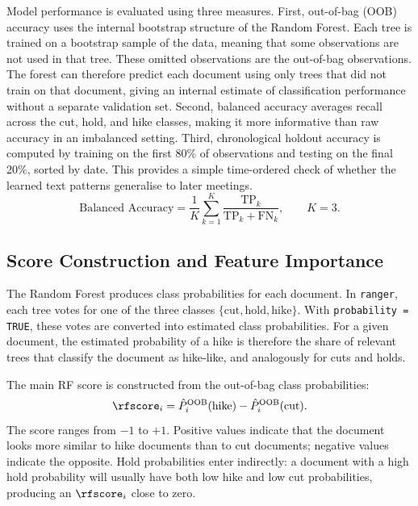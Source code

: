 Model performance is evaluated using three measures. First, out-of-bag
(OOB) accuracy uses the internal bootstrap structure of the Random
Forest. Each tree is trained on a bootstrap sample of the data, meaning
that some observations are not used in that tree. These omitted
observations are the out-of-bag observations. The forest can therefore
predict each document using only trees that did not train on that
document, giving an internal estimate of classification performance
without a separate validation set. Second, balanced accuracy averages
recall across the cut, hold, and hike classes, making it more informative
than raw accuracy in an imbalanced setting. Third, chronological holdout
accuracy is computed by training on the first 80\% of observations and
testing on the final 20\%, sorted by date. This provides a simple
time-ordered check of whether the learned text patterns generalise to
later meetings.
%
\begin{equation}
\label{eq:balanced_acc}
\text{Balanced Accuracy} = \frac{1}{K} \sum_{k=1}^{K}
  \frac{\text{TP}_k}{\text{TP}_k + \text{FN}_k},
  \qquad K=3.
\end{equation}


\subsection{Score Construction and Feature Importance}
\label{sec:meth_rf_score}
\label{sec:meth_rf_importance}
\label{sec:meth_model_selection}

The Random Forest produces class probabilities for each document. In
\texttt{ranger}, each tree votes for one of the three classes
\(\{\text{cut},\text{hold},\text{hike}\}\). With
\texttt{probability = TRUE}, these votes are converted into estimated
class probabilities. For a given document, the estimated probability of a
hike is therefore the share of relevant trees that classify the document
as hike-like, and analogously for cuts and holds.

The main RF score is constructed from the out-of-bag class
probabilities:
%
\begin{equation}
\label{eq:rfscore}
\rfscore_i
=
\hat{P}^{\text{OOB}}_i(\text{hike})
-
\hat{P}^{\text{OOB}}_i(\text{cut}).
\end{equation}
%
The score ranges from \(-1\) to \(+1\). Positive values indicate that
the document looks more similar to hike documents than to cut documents;
negative values indicate the opposite. Hold probabilities enter
indirectly: a document with a high hold probability will usually have
both low hike and low cut probabilities, producing an \(\rfscore_i\)
close to zero.

